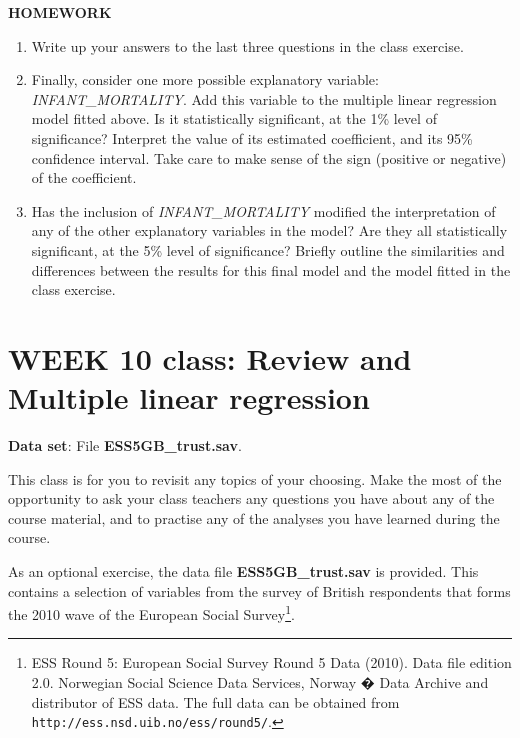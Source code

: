 \textbf{HOMEWORK}
\begin{enumerate}
\item
Write up your answers to the last three questions in the class exercise.
\item
Finally, consider one more possible explanatory variable:
\emph{INFANT\_MORTALITY}. Add this variable to the
multiple linear regression model fitted above. Is it statistically significant, at the 1\% level of significance?
Interpret the value of its estimated coefficient, and its 95\% confidence interval. Take care to make sense of
the sign (positive or negative) of the coefficient.
\item
Has the inclusion of \emph{INFANT\_MORTALITY} modified the interpretation of any of the other explanatory variables
in the model? Are they all statistically significant, at the 5\% level of significance?
Briefly outline the similarities and differences between the results for this final model and
the model fitted in the class exercise.
\end{enumerate}


\newpage
\section[Week 11: Review and Multiple linear regression]{WEEK 10 class:
Review and Multiple linear regression}

\textbf{Data set}: File \textbf{ESS5GB\_trust.sav}.

This class is for you to revisit any topics of your choosing. Make the most
of the opportunity to ask your class teachers any questions you have about any of the
course material, and to practise any of the analyses you have learned during the course.

As an optional exercise, the data file \textbf{ESS5GB\_trust.sav} is provided. This contains a selection
of variables from the survey of British respondents that forms the 2010 wave of the European Social
Survey\footnote{ESS Round 5: European Social Survey Round 5 Data (2010). Data file edition 2.0. Norwegian Social Science Data Services, Norway � Data Archive and distributor of ESS data. The full data can be
obtained from \texttt{http://ess.nsd.uib.no/ess/round5/}.}.

